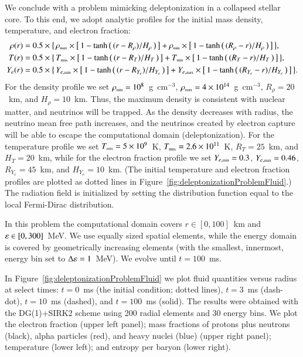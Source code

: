 \documentclass[11pt,letterpaper,twoside,english,final]{article}
\begin{document}
We conclude with a problem mimicking deleptonization in a collapsed stellar core.  
To this end, we adopt analytic profiles for the initial mass density, temperature, and electron fraction:
\begin{align}
  \rho(r)
  &=0.5\times
  \big\{\,
    \rho_{\mbox{\tiny max}}\times\big[\,1-\tanh\big(\,(r-R_{\rho})/H_{\rho}\,\big)\,\big]
    +\rho_{\mbox{\tiny min}}\times\big[\,1-\tanh\big(\,(R_{\rho}-r)/H_{\rho}\,\big)\,\big]
  \,\big\}, \\
  T(r)
  &=0.5\times
  \big\{\,
    T_{\mbox{\tiny max}}\times\big[\,1-\tanh\big(\,(r-R_{T})/H_{T}\,\big)\,\big]
    +T_{\mbox{\tiny min}}\times\big[\,1-\tanh\big(\,(R_{T}-r)/H_{T}\,\big)\,\big]
  \,\big\}, \\
  Y_{e}(r)
  &=0.5\times
  \big\{\,
    Y_{e,\mbox{\tiny min}}\times\big[\,1-\tanh\big(\,(r-R_{Y_{e}})/H_{Y_{e}}\,\big)\,\big]
    +Y_{e,\mbox{\tiny max}}\times\big[\,1-\tanh\big(\,(R_{Y_{e}}-r)/H_{Y_{e}}\,\big)\,\big]
  \,\big\}.  
\end{align}
For the density profile we set $\rho_{\mbox{\tiny min}}=10^{8}$~g~cm$^{-3}$, $\rho_{\mbox{\tiny max}}=4\times10^{14}$~g~cm$^{-3}$, $R_{\rho}=20$~km, and $H_{\rho}=10$~km.  
Thus, the maximum density is consistent with nuclear matter, and neutrinos will be trapped.  
As the density decreases with radius, the neutrino mean free path increases, and the neutrinos created by electron capture will be able to escape the computational domain (deleptonization).  
For the temperature profile we set $T_{\mbox{\tiny min}}=5\times10^{9}$~K, $T_{\mbox{\tiny max}}=2.6\times10^{11}$~K, $R_{T}=25$~km, and $H_{T}=20$~km, while for the electron fraction profile we set $Y_{e,\mbox{\tiny min}}=0.3$, $Y_{e,\mbox{\tiny max}}=0.46$, $R_{Y_{e}}=45$~km, and $H_{Y_{e}}=10$~km.  
(The initial temperature and electron fraction profiles are plotted as dotted lines in Figure~\ref{fig:deleptonizationProblemFluid}.)
The radiation field is initialized by setting the distribution function equal to the local Fermi-Dirac distribution.  

In this problem the computational domain covers $r\in[0,100]$~km and $\varepsilon\in[0,300]$~MeV.  
We use equally sized spatial elements, while the energy domain is covered by geometrically increasing elements (with the smallest, innermost, energy bin set to $\Delta\varepsilon=1$~MeV).  
We evolve until $t=100$~ms.  

In Figure~\ref{fig:deleptonizationProblemFluid} we plot fluid quantities versus radius at select times: $t=0$~ms (the initial condition; dotted lines), $t=3$~ms (dash-dot), $t=10$~ms (dashed), and $t=100$~ms (solid).  
The results were obtained with the DG(1)+SIRK2 scheme using 200 radial elements and 30 energy bins.  
We plot the electron fraction (upper left panel); mass fractions of protons plus neutrons (black), alpha particles (red), and heavy nuclei (blue) (upper right panel); temperature (lower left); and entropy per baryon (lower right).  
\end{document}
